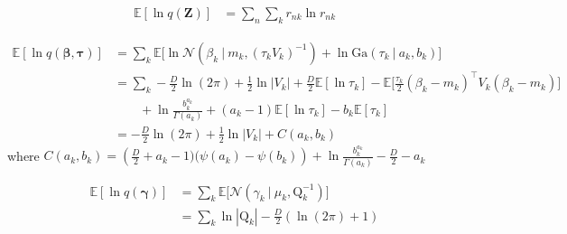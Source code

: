 \documentclass[twoside,11pt]{article}
\newcommand\given[1][]{\:#1\vert\:}
\newcommand{\transpose}[1]{#1^{\intercal}}
\newcommand{\nsum}{\sum_{n}}
\newcommand{\ksum}{\sum_{k}}
\newcommand{\boldbeta}{\boldsymbol\beta}
\newcommand{\boldgamma}{\boldsymbol\gamma}
\newcommand{\boldtau}{\boldsymbol\tau}
\newcommand{\E}{\mathbb{E}}
\begin{document}
\begin{equation} \label{eq:e5_deriv}
\begin{split}
	\E[\ln q(\mathbf{Z})] &=  \nsum \ksum r_{nk} \ln r_{nk}
\end{split}
\end{equation}

\begin{equation} \label{eq:e6_deriv}
\begin{split}
	\E[\ln q(\boldbeta, \boldtau)] &= \ksum \E \Big[ \ln \mathcal{N} \left( \beta_k \given m_k, (\tau_k V_k)^{-1}\right) + \ln \mathrm{Ga} \left( \tau_k \given a_k, b_k \right)\Big] \\
	&= \ksum -\frac{D}{2} \ln(2\pi) + \frac{1}{2} \ln |V_k| + \frac{D}{2} \E [\ln \tau_k] - \E \Big[ \frac{\tau_k}{2}\transpose{(\beta_k - m_k)} V_k (\beta_k - m_k) \Big] \\
	& \quad \quad + \ln \frac{b_k^{a_k}}{\Gamma(a_k)} + (a_k - 1) \E[ \ln \tau_k] - b_k \E[\tau_k] \\
	&= -\frac{D}{2} \ln (2\pi) + \frac{1}{2} \ln |V_k| + C(a_k, b_k)
\end{split}
\end{equation}
where $C(a_k, b_k) = \left(\frac{D}{2} + a_k - 1)(\psi(a_k) - \psi(b_k)\right) + \ln \frac{b_k^{a_k}}{\Gamma(a_k)} - \frac{D}{2} - a_k$

\begin{equation} \label{eq:e7_deriv}
\begin{split}
	\E[\ln q(\boldgamma)] &= \ksum \E \Big[ \mathcal{N} \left( \gamma_k \given \mu_k, \mathrm{Q}_{k}^{-1} \right)\Big] \\
	&= \sum_{k} \ln|\mathrm{Q}_k| - \frac{D}{2}(\ln (2\pi) + 1)
\end{split}
\end{equation}



\vskip 0.2in

\end{document}
